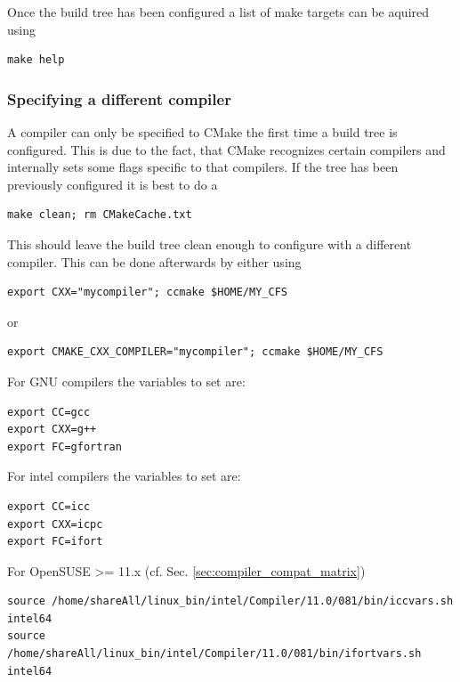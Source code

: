 Once the build tree has been configured a list of make targets can be aquired using

\begin{verbatim}
make help
\end{verbatim}

\subsubsection{Specifying a different compiler}

A compiler can only be specified to CMake the first time a build tree is configured. This is due to the fact, that CMake recognizes certain compilers and internally sets some flags specific to that compilers. If the tree has been previously configured it is best to do a

\begin{verbatim}
make clean; rm CMakeCache.txt
\end{verbatim}

This should leave the build tree clean enough to configure with a different compiler. This can be done afterwards by either using

\begin{verbatim}
export CXX="mycompiler"; ccmake $HOME/MY_CFS
\end{verbatim}

or

\begin{verbatim}
export CMAKE_CXX_COMPILER="mycompiler"; ccmake $HOME/MY_CFS
\end{verbatim}

For GNU compilers the variables to set are:

\begin{verbatim}
export CC=gcc
export CXX=g++
export FC=gfortran
\end{verbatim}

For intel compilers the variables to set are:

\begin{verbatim}
export CC=icc
export CXX=icpc
export FC=ifort
\end{verbatim}

For OpenSUSE >= 11.x (cf. Sec. \ref{sec:compiler_compat_matrix})

\begin{verbatim}
source /home/shareAll/linux_bin/intel/Compiler/11.0/081/bin/iccvars.sh intel64
source /home/shareAll/linux_bin/intel/Compiler/11.0/081/bin/ifortvars.sh intel64
\end{verbatim}

